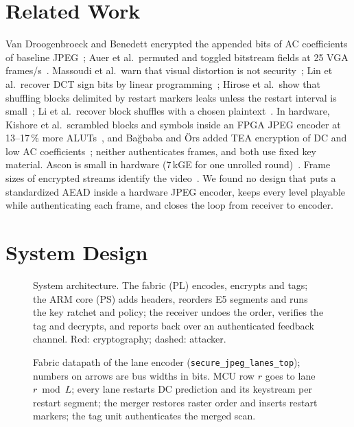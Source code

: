 \documentclass[conference]{IEEEtran}
\begin{document}
\section{Related Work}
Van Droogenbroeck and Benedett encrypted the appended bits of AC coefficients of baseline JPEG~\cite{vandroogenbroeck2002}; Auer et al.\ permuted and toggled bitstream fields at 25 VGA frames/s~\cite{auer2013}. Massoudi et al.\ warn that visual distortion is not security~\cite{massoudi2008}; Lin et al.\ recover DCT sign bits by linear programming~\cite{lin2024}; Hirose et al.\ show that shuffling blocks delimited by restart markers leaks unless the restart interval is small~\cite{hirose2024}; Li et al.\ recover block shuffles with a chosen plaintext~\cite{li2025shuffle}. In hardware, Kishore et al.\ scrambled blocks and symbols inside an FPGA JPEG encoder at 13--17\,\% more ALUTs~\cite{kishore2015}, and Ba\u{g}baba and \"Ors added TEA encryption of DC and low AC coefficients~\cite{bagbaba2015}; neither authenticates frames, and both use fixed key material. Ascon is small in hardware (7\,kGE for one unrolled round)~\cite{gross2017,ascon}. Frame sizes of encrypted streams identify the video~\cite{schuster2017}. We found no design that puts a standardized AEAD inside a hardware JPEG encoder, keeps every level playable while authenticating each frame, and closes the loop from receiver to encoder.

\section{System Design}\label{sec:design}
\begin{figure}[t]
\centering
\resizebox{0.92\textwidth}{!}{}
\caption{System architecture. The fabric (PL) encodes, encrypts and tags; the ARM core (PS) adds headers, reorders E5 segments and runs the key ratchet and policy; the receiver undoes the order, verifies the tag and decrypts, and reports back over an authenticated feedback channel. Red: cryptography; dashed: attacker.}
\label{fig:system}
\end{figure}
\begin{figure}[t]
\centering
\resizebox{\textwidth}{!}{}
\caption{Fabric datapath of the lane encoder (\texttt{secure\_jpeg\_lanes\_top}); numbers on arrows are bus widths in bits. MCU row $r$ goes to lane $r \bmod L$; every lane restarts DC prediction and its keystream per restart segment; the merger restores raster order and inserts restart markers; the tag unit authenticates the merged scan.}
\label{fig:pl}
\end{figure}
\end{document}
